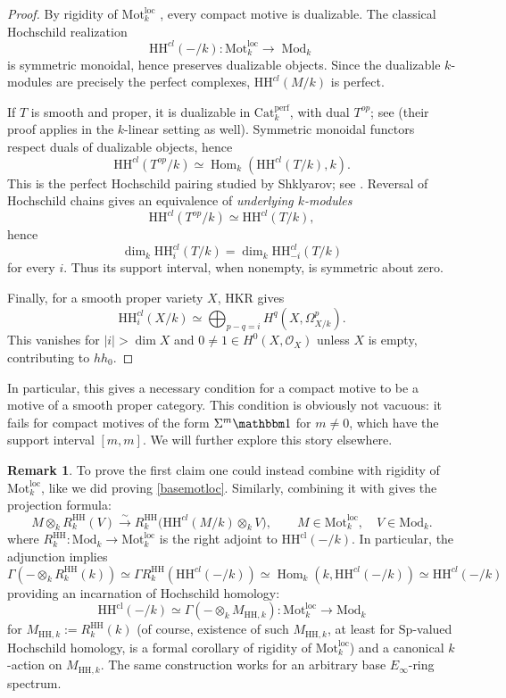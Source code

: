 \documentclass{amsart}
\theoremstyle{plain}
\theoremstyle{definition}
\newtheorem{remark}[prop]{Remark}
\newcommand{\lra}{\longrightarrow}
\newcommand{\Catperf}{\mathrm{Cat}^{\mathrm{perf}}}
\newcommand{\Motloc}{\mathrm{Mot}^{\mathrm{loc}}}
\newcommand{\HH}{\mathrm{HH}}
\newcommand{\Mod}{\mathrm{Mod}}
\newcommand{\Sp}{\mathrm{Sp}}
\DeclareMathOperator{\Hom}{Hom}
\newcommand{\cl}{\mathrm{cl}}
\begin{document}
\begin{proof}
By rigidity of $\Motloc_k$ \cite{Efi25b}, every compact motive is dualizable. The classical Hochschild realization
\[
\HH^{cl}(-/k):\Motloc_k\longrightarrow\operatorname{Mod}_k
\]
is symmetric monoidal, hence preserves dualizable objects.
Since the dualizable $k$-modules are precisely the perfect complexes, $\HH^{cl}(M/k)$ is perfect. 

If $T$ is smooth and proper, it is dualizable in
$\Catperf_k$, with dual $T^{op}$; see
\cite[Theorem 3.7]{BGT13} (their proof applies in the $k$-linear setting as well). Symmetric monoidal functors respect duals of dualizable objects, hence
\[
\HH^{cl}(T^{op}/k)
\simeq
\Hom_k(\HH^{cl}(T/k),k).
\]
This is the perfect Hochschild pairing studied by Shklyarov; see \cite[Theorem 6.2]{Shk08}.
Reversal of Hochschild chains gives an equivalence of \emph{underlying $k$-modules}
\[
\HH^{cl}(T^{op}/k)\simeq\HH^{cl}(T/k),
\]
hence
\[
\dim_k\HH^{cl}_i(T/k)
=
\dim_k\HH^{cl}_{-i}(T/k)
\]
for every $i$. Thus its support interval, when nonempty, is symmetric about zero.









Finally, for a smooth proper variety $X$, HKR gives
\[
\HH^{cl}_i(X/k)
\simeq
\bigoplus_{p-q=i}H^q(X,\Omega^p_{X/k}).
\]
This vanishes for $|i|>\dim X$ and $0\ne 1\in H^0(X,\mathcal{O}_X)$ unless $X$ is empty, contributing to $hh_0$.
\end{proof}

In particular, this gives a necessary condition for a compact motive to be a motive of a smooth proper category. This condition is obviously not vacuous: it fails for compact motives of the form $\Sigma^m\mathbbm 1$ for $m\ne 0$, which have the support interval $[m, m]$. We will further explore this story elsewhere.

\begin{remark}
To prove the first claim one could instead combine \cite[Proposition 1.9(i)]{Efi25a} with rigidity of $\Motloc_k$, like we did proving \eqref{basemotloc}. Similarly, combining it with \cite[Proposition 1.12(iv)]{Efi25a} gives the projection formula:
\[
M\otimes_k R^{\HH}_k(V)
\xrightarrow{\sim}
R^{\HH}_k\bigl(\HH^{cl}(M/k)\otimes_k V\bigr),
\qquad M\in\Motloc_k,\quad V\in\Mod_k.
\]
where $R^{\HH}_k:\Mod_k\lra \Motloc_k$ is the right adjoint to $\HH^\cl(-/k)$. In particular, the adjunction implies
\[
\Gamma(-\otimes_k R^{\HH}_k(k))
\simeq
\Gamma R^{\HH}_k(\HH^{cl}(-/k))
\simeq
\Hom_k(k,\HH^{cl}(-/k))
\simeq \HH^{cl}(-/k)
\]
providing an incarnation of Hochschild homology:
\[
\HH^{\cl}(-/k) \simeq \Gamma(-\otimes_kM_{\HH, k}) : \Motloc_k \lra \Mod_k
\]
for $M_{\HH, k}:= R^{\HH}_k(k)$ (of course, existence of such $M_{\HH, k}$, at least for $\Sp$-valued Hochschild homology, is a formal corollary of rigidity of $\Motloc_k$) and a canonical $k$-action on $M_{\HH, k}$. The same construction works for an arbitrary base $E_\infty$-ring spectrum.
\end{remark}
\end{document}
